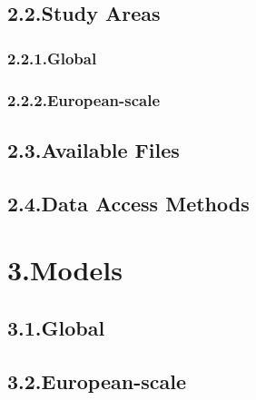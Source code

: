 \documentclass[9pt]{report}
\begin{document}
\subsection{2.2.\hspace*{0.5em}Study Areas}\label{sec-study-areas}%

\subsubsection{2.2.1.\hspace*{0.5em}Global}\label{sec-global}%

\subsubsection{2.2.2.\hspace*{0.5em}European-scale}\label{sec-european-scale}%

\subsection{2.3.\hspace*{0.5em}Available Files}\label{sec-available-files}%

\subsection{2.4.\hspace*{0.5em}Data Access Methods}\label{sec-data-access-methods}%

\section{3.\hspace*{0.5em}Models}\label{sec-models}%

\subsection{3.1.\hspace*{0.5em}Global}\label{sec-global}%

\subsection{3.2.\hspace*{0.5em}European-scale}\label{sec-european-scale}%
\end{document}
